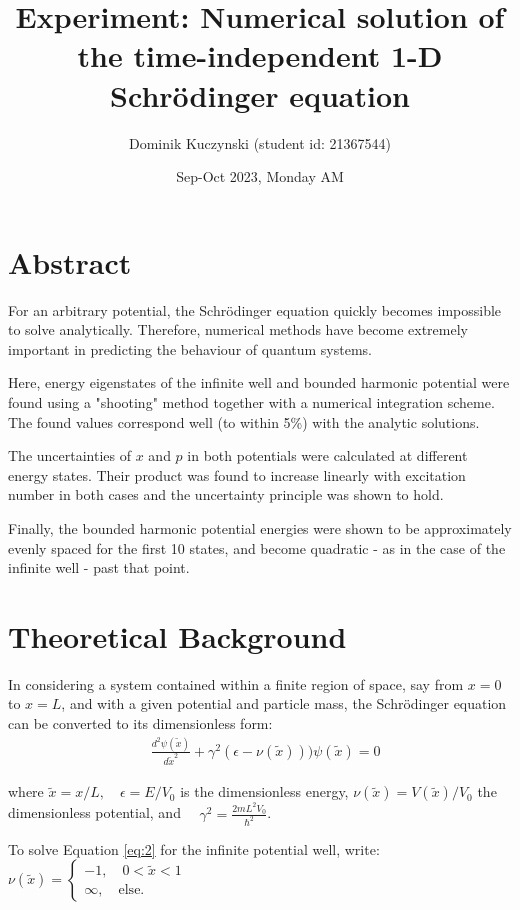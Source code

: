 \documentclass[11pt]{article}
\title{\textbf{Experiment: Numerical solution of the time-independent 1-D Schr{\"o}dinger equation}}
\author{Dominik Kuczynski (student id: 21367544)}
\date{Sep-Oct 2023, Monday AM}
\begin{document}
\maketitle

\tableofcontents

\newpage

\section{Abstract}

For an arbitrary potential, the Schr{\"o}dinger equation quickly becomes
impossible to solve analytically. Therefore, numerical
methods have become extremely important in predicting the behaviour
of quantum systems.

Here, energy eigenstates of the infinite well and bounded harmonic 
potential were found using a "shooting" method
together with a numerical integration scheme. The found values
correspond well (to within 5\%) with the analytic solutions.

The uncertainties of $x$ and $p$ in both potentials were calculated
at different energy states. Their product was found to increase
linearly with excitation number in both cases and the uncertainty principle 
was shown to hold.

Finally, the bounded harmonic potential energies were shown to be
approximately evenly spaced for the first 10 states, and become
quadratic - as in the case of the infinite well - past that point.


\section{Theoretical Background}

In considering a system contained within a finite region of space, say from
$x=0$ to $x=L$, and with a given potential and particle mass, the
Schr{\"o}dinger equation can be converted to its dimensionless form:
\begin{align}
     &\frac{d^2 \psi(\tilde{x})}{d\tilde{x}^2}+\gamma^2 (\epsilon-\nu(\tilde{x})))\psi(\tilde{x})=0
     \label{eq:2}
\end{align}

where $\tilde{x}=x/L,\quad \epsilon=E/V_0$ is the dimensionless energy, 
$\nu(\tilde{x})=V(\tilde{x})/V_0$ the dimensionless potential, and 
$\quad \gamma^2=\frac{2mL^2V_0}{\hbar^2}$.

To solve Equation \ref{eq:2} for the infinite potential well, write:
$  \nu(\tilde{x})=
  \begin{cases}
    -1,\quad 0<\tilde{x}<1\\
    \infty,\quad \text{else.}
  \end{cases}$
\end{document}
